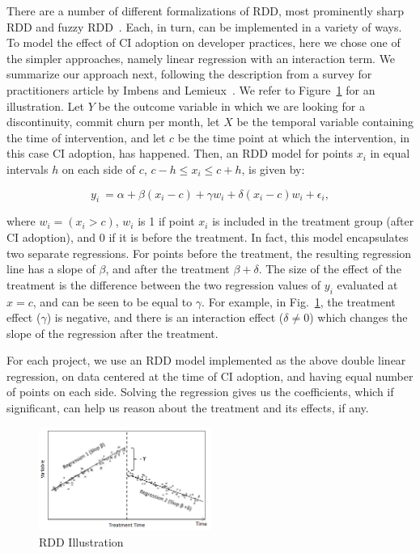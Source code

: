 There are a number of different formalizations of RDD, most prominently 
sharp RDD and fuzzy RDD~\cite{imbens2008regression}.
Each, in turn, can be implemented in a variety of ways.
To model the effect of CI adoption on developer practices, here we chose one 
of the simpler approaches, namely linear regression with an interaction term.
We summarize our approach next, following the description from a survey for practitioners article by Imbens and Lemieux~\cite{imbens2008}.
We refer to Figure~\ref{RDDIllustration} for an illustration.
Let $Y$ be the outcome variable in which we are looking for a discontinuity, 
\eg commit churn per month, let $X$ be the temporal variable containing the 
time of intervention, and let $c$ be the time point at which the intervention, in 
this case CI adoption, has happened.
Then, an RDD model for points $x_i$ in equal intervals $h$ on each side of 
$c$, $c-h \le x_i \le c+h$, is given by:

\[y_i \ = \alpha + \beta(x_i-c) + \gamma w_i + \delta(x_i-c)w_i + \epsilon_i,\]

\noindent where $w_i = (x_i > c)$, \ie $w_i$ is 1 if point $x_i$ is included in 
the treatment group (\eg after CI adoption), and 0 if it is before the treatment.
In fact, this model encapsulates two separate regressions.
For points before the treatment, the resulting regression line has a slope of 
$\beta$, and after the treatment $\beta + \delta$.
The size of the effect of the treatment is the difference between the two 
regression values of $y_i$ evaluated at $x=c$, and can be seen to be equal 
to $\gamma$.
For example, in Fig.~\ref{RDDIllustration}, the treatment effect ($\gamma$) is negative, and there is an interaction effect ($\delta \neq 0$) which changes the slope of the regression after the treatment.

For each project, we use an RDD model implemented as the above 
double linear regression, on data centered at the time of CI adoption, and 
having equal number of points on each side.
Solving the regression gives us the coefficients, which if significant, can help us reason about the treatment and its effects, if any.
 

\begin{figure}[t]
	\centering
	\includegraphics[width=0.5\textwidth, clip=true, trim=0 15 15 50]{RDD_ok.png}
	\caption{RDD Illustration}
	\label{RDDIllustration}
\end{figure}

